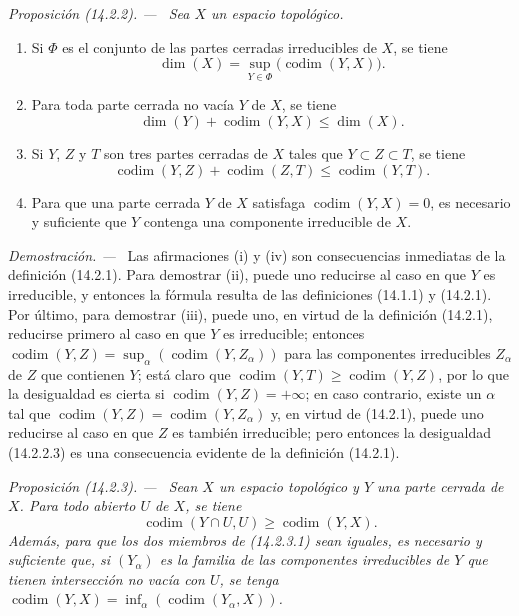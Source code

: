 \documentclass[10pt,oneside]{book}
\makeatletter
\newcommand{\setmanualcurrentlabel}[1]{\def\@currentlabel{#1}}
\newcommand{\oldpage}[2][]{%
  \setcounter{footnote}{0}%
  \marginpar{\scriptsize\textbf{#1}~|~#2}\ignorespaces}
\newenvironment{proposition}[1][]{%
  \setmanualcurrentlabel{#1}\par\medskip\noindent\itshape Proposición (#1). ---\ }{\par}
\newenvironment{proof}{%
  \par\medskip\noindent\textit{Demostración. ---\ }}{\par}
\makeatother
\begin{document}
\begin{proposition}[14.2.2]
\label{0.14.2.2-es}
Sea $X$ un espacio topológico.
\begin{enumerate}
  \item[\rm(i)] Si $\Phi$ es el conjunto de las partes cerradas irreducibles de
  $X$, se tiene
  \[
    \dim(X)=\sup_{Y\in\Phi}\bigl(\operatorname{codim}(Y,X)\bigr).
    \tag{14.2.2.1}\label{0.14.2.2.1-es}
  \]
  \oldpage[0\textsubscript{IV-1}]{9}
  \item[\rm(ii)] Para toda parte cerrada no vacía $Y$ de $X$, se tiene
  \[
    \dim(Y)+\operatorname{codim}(Y,X)\leq\dim(X).
    \tag{14.2.2.2}\label{0.14.2.2.2-es}
  \]
  \item[\rm(iii)] Si $Y$, $Z$ y $T$ son tres partes cerradas de $X$ tales que
  $Y\subset Z\subset T$, se tiene
  \[
    \operatorname{codim}(Y,Z)+\operatorname{codim}(Z,T)
    \leq\operatorname{codim}(Y,T).
    \tag{14.2.2.3}\label{0.14.2.2.3-es}
  \]
  \item[\rm(iv)] Para que una parte cerrada $Y$ de $X$ satisfaga
  $\operatorname{codim}(Y,X)=0$, es necesario y suficiente que $Y$ contenga
  una componente irreducible de $X$.
\end{enumerate}
\end{proposition}

\begin{proof}
Las afirmaciones (i) y (iv) son consecuencias inmediatas de la definición
(14.2.1). Para demostrar (ii), puede uno reducirse al caso en que $Y$ es
irreducible, y entonces la fórmula resulta de las definiciones (14.1.1) y
(14.2.1). Por último, para demostrar (iii), puede uno, en virtud de la
definición (14.2.1), reducirse primero al caso en que $Y$ es irreducible;
entonces $\operatorname{codim}(Y,Z)=
\sup_\alpha(\operatorname{codim}(Y,Z_\alpha))$ para las componentes
irreducibles $Z_\alpha$ de $Z$ que contienen $Y$; está claro que
$\operatorname{codim}(Y,T)\geq\operatorname{codim}(Y,Z)$, por lo que la
desigualdad es cierta si $\operatorname{codim}(Y,Z)=+\infty$; en caso
contrario, existe un $\alpha$ tal que
$\operatorname{codim}(Y,Z)=\operatorname{codim}(Y,Z_\alpha)$ y, en virtud de
(14.2.1), puede uno reducirse al caso en que $Z$ es también irreducible; pero
entonces la desigualdad (14.2.2.3) es una consecuencia evidente de la
definición (14.2.1).
\end{proof}

\begin{proposition}[14.2.3]
\label{0.14.2.3-es}
Sean $X$ un espacio topológico y $Y$ una parte cerrada de $X$. Para todo
abierto $U$ de $X$, se tiene
\[
  \operatorname{codim}(Y\cap U,U)\geq\operatorname{codim}(Y,X).
  \tag{14.2.3.1}\label{0.14.2.3.1-es}
\]
Además, para que los dos miembros de \textup{(14.2.3.1)} sean iguales, es necesario y
suficiente que, si $(Y_\alpha)$ es la familia de las componentes irreducibles
de $Y$ que tienen intersección no vacía con $U$, se tenga
$\operatorname{codim}(Y,X)=
\inf_\alpha(\operatorname{codim}(Y_\alpha,X))$.
\end{proposition}
\end{document}
